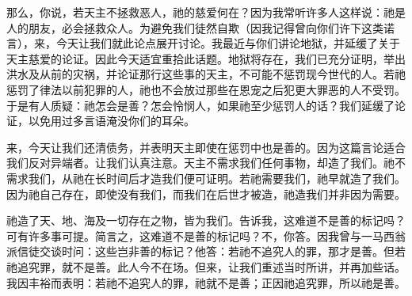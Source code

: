 那么，你说，若天主不拯救恶人，祂的慈爱何在？因为我常听许多人这样说：祂是人的朋友，必会拯救众人。为避免我们徒然自欺（因我记得曾向你们许下这类诺言），来，今天让我们就此论点展开讨论。我最近与你们讲论地狱，并延缓了关于天主慈爱的论证。因此今天适宜重拾此话题。地狱将存在，我们已充分证明，举出洪水及从前的灾祸，并论证那行这些事的天主，不可能不惩罚现今世代的人。若祂惩罚了律法以前犯罪的人，祂也不会放过那些在恩宠之后犯更大罪恶的人不受罚。于是有人质疑：祂怎会是善？怎会怜悯人，如果祂至少惩罚人的话？我们延缓了论证，以免用过多言语淹没你们的耳朵。\par

来，今天让我们还清债务，并表明天主即使在惩罚中也是善的。因为这篇言论适合我们反对异端者。让我们认真注意。天主不需求我们任何事物，却造了我们。祂不需求我们，从祂在长时间后才造我们便可证明。若祂需要我们，祂早就造了我们。因为祂自己存在，即使没有我们，而我们在后世才被造，祂造我们并非因为需要。\par

祂造了天、地、海及一切存在之物，皆为我们。告诉我，这难道不是善的标记吗？可有许多事可提。简言之，这难道不是善的标记吗？不，你答。因我曾与一马西翁派信徒交谈时问：这些岂非善的标记？他答：若祂不追究人的罪，那才是善。但若祂追究罪，就不是善。此人今不在场。但来，让我们重述当时所讲，并再加些话。我因丰裕而表明：若祂不追究人的罪，祂就不是善；正因祂追究罪，所以祂是善。\par

